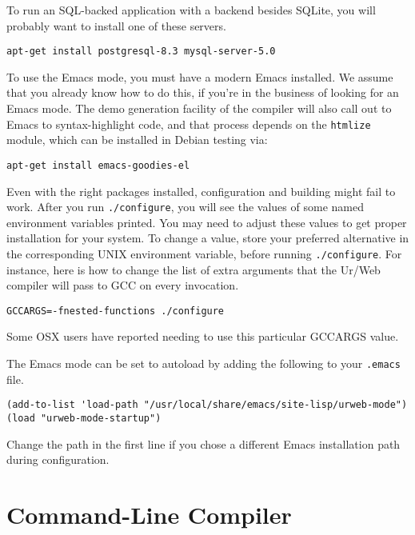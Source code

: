 \documentclass{article}
\begin{document}
To run an SQL-backed application with a backend besides SQLite, you will probably want to install one of these servers.

\begin{verbatim}
apt-get install postgresql-8.3 mysql-server-5.0
\end{verbatim}

To use the Emacs mode, you must have a modern Emacs installed.  We assume that you already know how to do this, if you're in the business of looking for an Emacs mode.  The demo generation facility of the compiler will also call out to Emacs to syntax-highlight code, and that process depends on the \texttt{htmlize} module, which can be installed in Debian testing via:

\begin{verbatim}
apt-get install emacs-goodies-el
\end{verbatim}

Even with the right packages installed, configuration and building might fail to work.  After you run \texttt{./configure}, you will see the values of some named environment variables printed.  You may need to adjust these values to get proper installation for your system.  To change a value, store your preferred alternative in the corresponding UNIX environment variable, before running \texttt{./configure}.  For instance, here is how to change the list of extra arguments that the Ur/Web compiler will pass to GCC on every invocation.

\begin{verbatim}
GCCARGS=-fnested-functions ./configure
\end{verbatim}

Some OSX users have reported needing to use this particular GCCARGS value.

The Emacs mode can be set to autoload by adding the following to your \texttt{.emacs} file.

\begin{verbatim}
(add-to-list 'load-path "/usr/local/share/emacs/site-lisp/urweb-mode")
(load "urweb-mode-startup")
\end{verbatim}

Change the path in the first line if you chose a different Emacs installation path during configuration.


\section{Command-Line Compiler}
\end{document}
